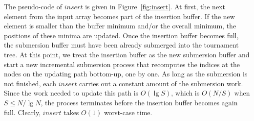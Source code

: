 \documentclass[final,onetabnum,onefignum,onethmnum]{siamltex}
\newcommand{\Insert}{\mbox{$\mathit{insert}$}}
\begin{document}
The pseudo-code of \Insert{} is given in Figure~\ref{fig:insert}.  At
first, the next element from the input array becomes part of the
insertion buffer. If the new element is smaller than the buffer
minimum and/or the overall minimum, the positions of these minima are
updated.  Once the insertion buffer becomes full, the submersion
buffer must have been already submerged into the tournament tree.  At
this point, we treat the insertion buffer as the new submersion buffer
and start a new incremental submersion process that recomputes the
indices at the nodes on the updating path bottom-up, one by one.  As
long as the submersion is not finished, each \Insert{} carries out a
constant amount of the submersion work. Since the work needed to
update this path is $O(\lg S)$, which is $O(N/S)$ when $S \leq N/\lg N$, the process
terminates before the insertion buffer becomes again full.  
Clearly, \Insert{} takes $O(1)$ worst-case time.
\end{document}
